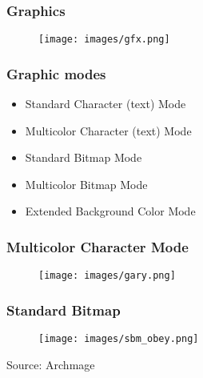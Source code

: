 \documentclass[aspectratio=43]{uva-inf-presentation}
\begin{document}

\begin{frame}
\frametitle{Graphics}

\begin{figure}
\texttt{[image: images/gfx.png]}
\end{figure}

\end{frame}


\begin{frame}
\frametitle{Graphic modes}

\begin{itemize}
\item Standard Character (text) Mode
\item Multicolor Character (text) Mode
\item Standard Bitmap Mode
\item Multicolor Bitmap Mode
\item Extended Background Color Mode
\end{itemize}

\end{frame}


\begin{frame}
\frametitle{Multicolor Character Mode}

\begin{figure}
\texttt{[image: images/gary.png]}
\end{figure}

\end{frame}


\begin{frame}
\frametitle{Standard Bitmap}

\begin{figure}
\texttt{[image: images/sbm\_obey.png]}
\end{figure}

\begin{center}
Source: Archmage
\end{center}

\end{frame}

\end{document}
